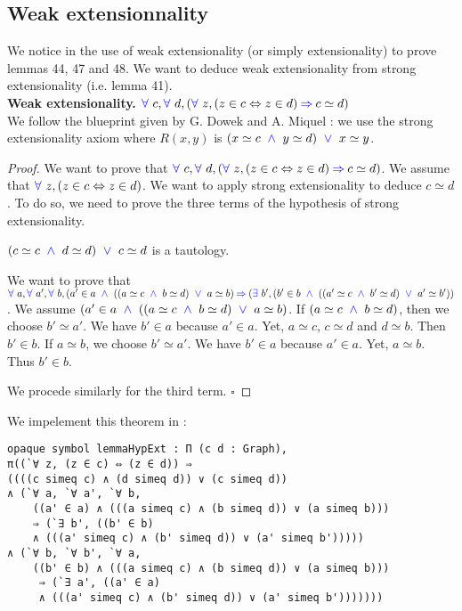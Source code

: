 \documentclass[a4paper]{article}
\begin{document}
\subsection{Weak extensionnality}

We notice in \cite{zermodulo53} the use of weak extensionality (or simply extensionality) to prove lemmas 44, 47 and 48. We want to deduce weak extensionality from strong extensionality (i.e. lemma 41). \\

\textbf{Weak extensionality.} ${\color{blue} \forall}~c,{\color{blue} \forall}~d, ({\color{blue} \forall}~z, (z \in c \Leftrightarrow z \in d) \mathbin{\color{blue} \Rightarrow} c \simeq d)$ \\

We follow the blueprint given by G. Dowek and A. Miquel \cite{zermodulo} : we use the strong extensionality axiom where $R(x,y)$ is $(x \simeq c~\mathbin{\color{blue} \wedge}~y \simeq d)~\mathbin{\color{blue} \vee}~x \simeq y$. \\

\begin{proof}
We want to prove that ${\color{blue} \forall}~c,{\color{blue} \forall}~d, ({\color{blue} \forall}~z, (z \in c \Leftrightarrow z \in d) \mathbin{\color{blue} \Rightarrow} c \simeq d)$. We assume that ${\color{blue} \forall}~z, (z \in c \Leftrightarrow z \in d)$. We want to apply strong extensionality to deduce $c \simeq d$. To do so, we need to prove the three terms of the hypothesis of strong extensionality.

$(c \simeq c~\mathbin{\color{blue} \wedge}~d \simeq d)~\mathbin{\color{blue} \vee}~c \simeq d$ is a tautology.

We want to prove that ${\color{blue} \forall}~a,{\color{blue} \forall}~a',{\color{blue} \forall}~b, (a' \in a~\mathbin{\color{blue} \wedge}~((a \simeq c~\mathbin{\color{blue} \wedge}~b \simeq d)~\mathbin{\color{blue} \vee}~a \simeq b) \mathbin{\color{blue} \Rightarrow} ({\color{blue} \exists}~b', (b' \in b~\mathbin{\color{blue} \wedge}~((a' \simeq c~\mathbin{\color{blue} \wedge}~b' \simeq d)~\mathbin{\color{blue} \vee}~a' \simeq b'))$. We assume $(a' \in a~\mathbin{\color{blue} \wedge}~((a \simeq c~\mathbin{\color{blue} \wedge}~b \simeq d)~\mathbin{\color{blue} \vee}~a \simeq b)$. If $(a \simeq c~\mathbin{\color{blue} \wedge}~b \simeq d)$, then we choose $b' \simeq a'$. We have $b' \in a$ because $a' \in a$. Yet, $a \simeq c$, $c \simeq d$ and $d \simeq b$. Then $b' \in b$. If $a \simeq b$, we choose $b' \simeq a'$. We have $b' \in a$ because $a' \in a$. Yet, $a \simeq b$. Thus $b' \in b$.

We procede similarly for the third term. $\square$
\end{proof}

We impelement this theorem in \dedukti:

\begin{lstlisting}
opaque symbol lemmaHypExt : Π (c d : Graph), 
π((`∀ z, (z ∈ c) ⇔ (z ∈ d)) ⇒ 
((((c simeq c) ∧ (d simeq d)) ∨ (c simeq d))
∧ (`∀ a, `∀ a', `∀ b, 
	((a' ∈ a) ∧ (((a simeq c) ∧ (b simeq d)) ∨ (a simeq b))) 
	⇒ (`∃ b', ((b' ∈ b) 
	∧ (((a' simeq c) ∧ (b' simeq d)) ∨ (a' simeq b')))))
∧ (`∀ b, `∀ b', `∀ a, 
	((b' ∈ b) ∧ (((a simeq c) ∧ (b simeq d)) ∨ (a simeq b)))
	 ⇒ (`∃ a', ((a' ∈ a) 
	 ∧ (((a' simeq c) ∧ (b' simeq d)) ∨ (a' simeq b')))))))
\end{lstlisting}
\end{document}
